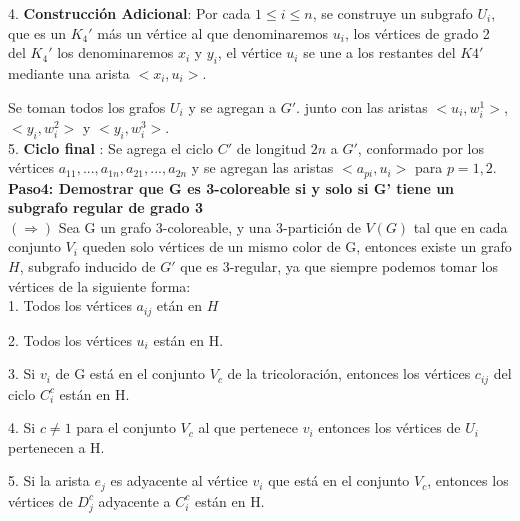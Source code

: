 \documentclass[
10pt, %
a4paper, %
oneside, %
headinclude,footinclude, %
BCOR5mm, %
]{scrartcl}
\begin{document}
4. \textbf{Construcción Adicional}: Por cada $1 \leq i \leq n$, se construye un subgrafo $U_i$, que es un $K_4'$ más un vértice al que denominaremos $u_i$, los vértices de grado 2 del $K_4'$ los denominaremos 
$x_i$ y $y_i$, el vértice $u_i$ se une a los restantes del $K4'$ mediante una arista $<x_i, u_i>$. 

Se toman todos los grafos $U_i$ y se agregan a $G'$. junto con las aristas $<u_i,w^1_i>$, $<y_i, w^2_i>$ y $<y_i, w^3_i>$.\\


5. \textbf{Ciclo final} : Se agrega el ciclo $C'$ de longitud $2n$ a $G'$, conformado por los vértices ${a_{11},..., a_{1n}, a_{21},..., a_{2n}}$ y se agregan las aristas $<a_{pi}, u_i>$ para $p = 1,2$.\\


\textbf{Paso4: Demostrar que G es 3-coloreable si y solo si G' tiene un subgrafo regular de grado 3  }\\

$(\Rightarrow)$ Sea G un grafo 3-coloreable, y una 3-partición de $V(G)$ tal que en cada conjunto $V_i$ queden solo vértices de un mismo color de G, entonces existe un grafo $H$, 
subgrafo inducido de $G'$ que es 3-regular, ya que siempre podemos tomar los vértices de la siguiente forma:\\

1. Todos los vértices $a_{ij}$ etán en $H$

2. Todos los vértices $u_i$ est\'an en H.

3. Si $v_i$ de G est\'a en el conjunto $V_c$ de la tricoloraci\'on, entonces los v\'ertices $c_{ij}$ del ciclo $C^c_i$ est\'an en H.

4. Si $ c \neq 1$ para el conjunto $V_c$ al que pertenece $v_i$ entonces los vértices de $U_i$ pertenecen a H.

5. Si la arista $e_j$ es adyacente al v\'ertice $v_i$ que est\'a en el conjunto $V_c$, entonces los v\'ertices de $D^c_j$ adyacente a $C^c_i$ est\'an en H. \\
\end{document}
